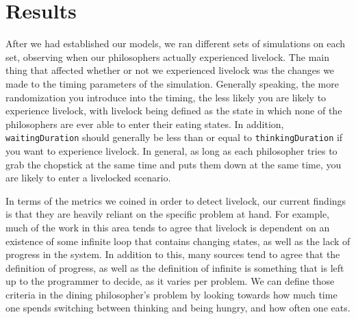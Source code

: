 \documentclass{article}
\begin{document}
\section{Results} %

After we had established our models, we ran different sets of simulations on each set, observing when our philosophers actually 
experienced livelock.  The main thing that affected whether or not we experienced livelock was the changes we made to the timing 
parameters of the simulation.  Generally speaking, the more randomization you introduce into the timing, the less likely you are 
likely to experience livelock, with livelock being defined as the state in which none of the philosophers are ever able to enter 
their eating states.  In addition, \texttt{waitingDuration} should generally be less than or equal to \texttt{thinkingDuration} if you 
want to experience livelock.  In general, as long as each philosopher tries to grab the chopstick at the same time and puts them 
down at the same time, you are likely to enter a livelocked scenario. \newline

In terms of the metrics we coined in order to detect livelock, our current findings is that they are heavily reliant on the 
specific problem at hand.  For example, much of the work in this area tends to agree that livelock is dependent on an existence 
of some infinite loop that contains changing states, as well as the lack of progress in the system.  In addition to this, many 
sources tend to agree that the definition of progress, as well as the definition of infinite is something that is left up to the 
programmer to decide, as it varies per problem.  We can define those criteria in the dining philosopher's problem by looking towards 
how much time one spends switching between thinking and being hungry, and how often one eats. \newline
\end{document}
